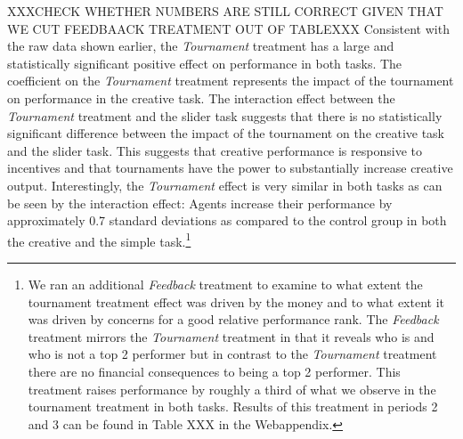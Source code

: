 XXXCHECK WHETHER NUMBERS ARE STILL CORRECT GIVEN THAT WE CUT FEEDBAACK TREATMENT OUT OF TABLEXXX
Consistent with the raw data shown earlier, the \textit{Tournament} treatment has a large and statistically significant positive effect 
on performance in both tasks. The coefficient on the \textit{Tournament} treatment represents the impact of the tournament on performance in the creative task.
The interaction effect between the \textit{Tournament} treatment and the slider task suggests that there is no statistically significant difference between the impact of the tournament on the 
creative task and the slider task. 
This suggests that creative performance is responsive to incentives and that 
tournaments have the power to substantially increase creative output. 
Interestingly, the \textit{Tournament} effect is  very similar in both tasks as can be seen by the interaction effect: Agents increase their performance by 
approximately 0.7 standard deviations as compared to the control group in both the 
creative and the simple task.\footnote{We ran an additional \textit{Feedback} treatment to examine to what extent the 
tournament treatment effect was driven by the money and to what extent it was driven by concerns for a 
good relative performance rank. The \textit{Feedback} treatment mirrors the \textit{Tournament} treatment in that it 
reveals who is and who is not a top 2 performer but in contrast to the \textit{Tournament} treatment there are no 
financial consequences to being a top 2 performer. This treatment raises performance by roughly a third of what we observe 
in the tournament treatment in both tasks. Results of this treatment in periods 2 and 3 can be found in Table XXX in the Webappendix. }

